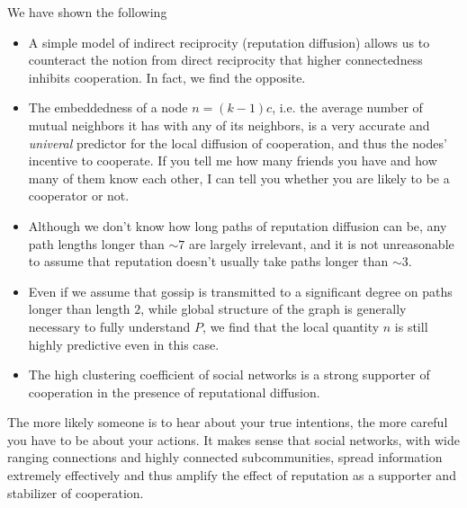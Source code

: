 \documentclass{article}
\renewcommand{\=}[1]{\stackrel{#1}{=}} %
\begin{document}



We have shown the following

\begin{itemize}

\item A simple model of indirect reciprocity (reputation diffusion) allows us to counteract the notion from direct reciprocity that higher connectedness inhibits cooperation. In fact, we find the opposite.

\item The embeddedness of a node $n = (k-1) c$, i.e. the average number of mutual neighbors it has with any of its neighbors, is a very accurate and \emph{univeral} predictor for the local diffusion of cooperation, and thus the nodes' incentive to cooperate. If you tell me how many friends you have and how many of them know each other, I can tell you whether you are likely to be a cooperator or not.

\item Although we don't know how long paths of reputation diffusion can be, any path lengths longer than $\sim 7$ are largely irrelevant, and it is not unreasonable to assume that reputation doesn't usually take paths longer than $\sim 3$.

\item Even if we assume that gossip is transmitted to a significant degree on paths longer than length $2$, while global structure of the graph is generally necessary to fully understand $P$, we find that the local quantity $n$ is still highly predictive even in this case.

\item The high clustering coefficient of social networks is a strong supporter of cooperation in the presence of reputational diffusion.

\end{itemize}

The more likely someone is to hear about your true intentions, the more careful you have to be about your actions. It makes sense that social networks, with wide ranging connections and highly connected subcommunities, spread information extremely effectively and thus amplify the effect of reputation as a supporter and stabilizer of cooperation.
\end{document}
